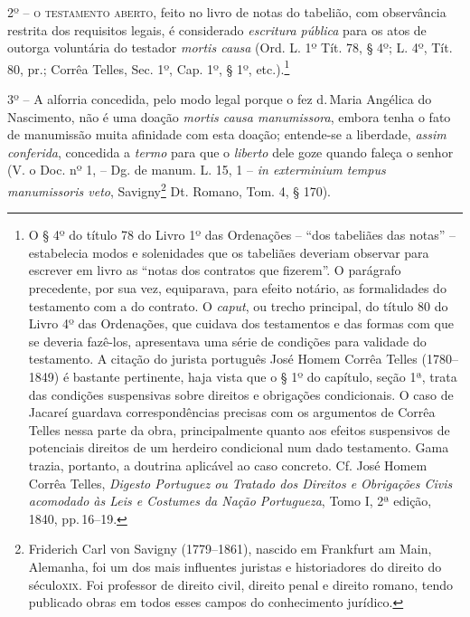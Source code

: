2º -- \textsc{o testamento aberto}, feito no livro de notas do tabelião, com
observância restrita dos requisitos legais, é considerado
\emph{escritura pública} para os atos de outorga voluntária do testador
\emph{mortis causa} (Ord. L. 1º Tít. 78, § 4º; L. 4º, Tít. 80, pr.;
Corrêa Telles, Sec. 1º, Cap. 1º, § 1º, etc.).\footnote{ O § 4º do
  título 78 do Livro 1º das Ordenações -- ``dos tabeliães das notas'' --
  estabelecia modos e solenidades que os tabeliães deveriam observar
  para escrever em livro as ``notas dos contratos que fizerem''. O
  parágrafo precedente, por sua vez, equiparava, para efeito notário, as
  formalidades do testamento com a do contrato. O \emph{caput}, ou
  trecho principal, do título 80 do Livro 4º das Ordenações, que cuidava
  dos testamentos e das formas com que se deveria fazê-los, apresentava
  uma série de condições para validade do testamento. A citação do
  jurista português José Homem Corrêa Telles (1780--1849) é bastante
  pertinente, haja vista que o § 1º do capítulo, seção 1ª, trata das
  condições suspensivas sobre direitos e obrigações condicionais. O caso
  de Jacareí guardava correspondências precisas com os argumentos de
  Corrêa Telles nessa parte da obra, principalmente quanto aos efeitos
  suspensivos de potenciais direitos de um herdeiro condicional num dado
  testamento. Gama trazia, portanto, a doutrina aplicável ao caso
  concreto. Cf. José Homem Corrêa Telles, \emph{Digesto Portuguez ou
  Tratado dos Direitos e Obrigações Civis acomodado às Leis e Costumes
  da Nação Portugueza}, Tomo I, 2ª edição, 1840, pp.\,16--19.}

3º -- A alforria concedida, pelo modo legal porque o fez d.\,Maria
Angélica do Nascimento, não é uma doação \emph{mortis causa
manumissora}, embora tenha o fato de manumissão muita afinidade com esta
doação; entende-se a liberdade, \emph{assim conferida}, concedida a
\emph{termo} para que o \emph{liberto} dele goze quando faleça o senhor
(V. o Doc. nº 1, -- Dg. de manum. L. 15, 1 -- \emph{in exterminium
tempus manumissoris veto}, Savigny\footnote{ Friderich Carl von Savigny
  (1779--1861), nascido em Frankfurt am Main, Alemanha, foi um dos mais
  influentes juristas e historiadores do direito do século\textsc{xix}. Foi
  professor de direito civil, direito penal e direito romano, tendo
  publicado obras em todos esses campos do conhecimento jurídico.} Dt.
Romano, Tom. 4, § 170).

